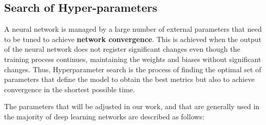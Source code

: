 \subsection{Search of Hyper-parameters}

A neural network is managed by a large number of external parameters that need to be tuned to achieve \textbf{network convergence}. This is achieved when the output of the neural network does not register significant changes even though the training process continues, maintaining the weights and biases without significant changes. Thus, Hyperparameter search is the process of finding the optimal set of parameters that define the model to obtain the best metrics but also to achieve convergence in the shortest possible time.

The parameters that will be adjusted in our work, and that are generally used in the majority of deep learning networks are described as follows:

